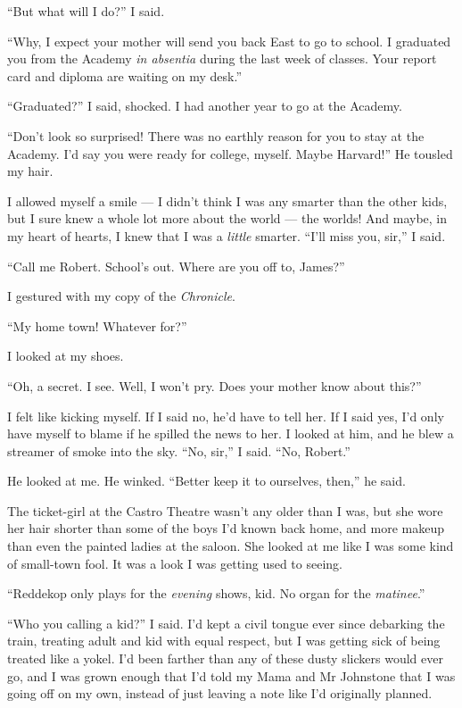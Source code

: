 ``But what will I do?'' I said.

``Why, I expect your mother will send you back East to go to school. I 
graduated you from the Academy \emph{in absentia} during the last week of 
classes. Your report card and diploma are waiting on my desk.''

``Graduated?'' I said, shocked. I had another year to go at the
Academy.

``Don't look so surprised! There was no earthly reason for you to stay at the 
Academy. I'd say you were ready for college, myself. Maybe Harvard!''
He tousled my hair.

I allowed myself a smile --- I didn't think I was any smarter than
the other kids, but I sure knew a whole lot more about the world
--- the worlds! And maybe, in my heart of hearts, I knew that I was
a \emph{little} smarter. ``I'll miss you, sir,'' I said.

``Call me Robert. School's out. Where are you off to, James?''

I gestured with my copy of the \emph{Chronicle}.

``My home town! Whatever for?''

I looked at my shoes.

``Oh, a secret. I see. Well, I won't pry. Does your mother know about this?''

I felt like kicking myself. If I said no, he'd have to tell her. If
I said yes, I'd only have myself to blame if he spilled the news to
her. I looked at him, and he blew a streamer of smoke into the sky.
``No, sir,'' I said. ``No, Robert.''

He looked at me. He winked. ``Better keep it to ourselves, then,''
he said.

\tb

The ticket-girl at the Castro Theatre wasn't any older than I was,
but she wore her hair shorter than some of the boys I'd known back
home, and more makeup than even the painted ladies at the saloon.
She looked at me like I was some kind of small-town fool. It was a
look I was getting used to seeing.

``Reddekop only plays for the \emph{evening} shows, kid. No organ for the 
\emph{matinee}.''

``Who you calling a kid?'' I said. I'd kept a civil tongue ever
since debarking the train, treating adult and kid with equal
respect, but I was getting sick of being treated like a yokel. I'd
been farther than any of these dusty slickers would ever go, and I
was grown enough that I'd told my Mama and Mr Johnstone that I was
going off on my own, instead of just leaving a note like I'd
originally planned.

